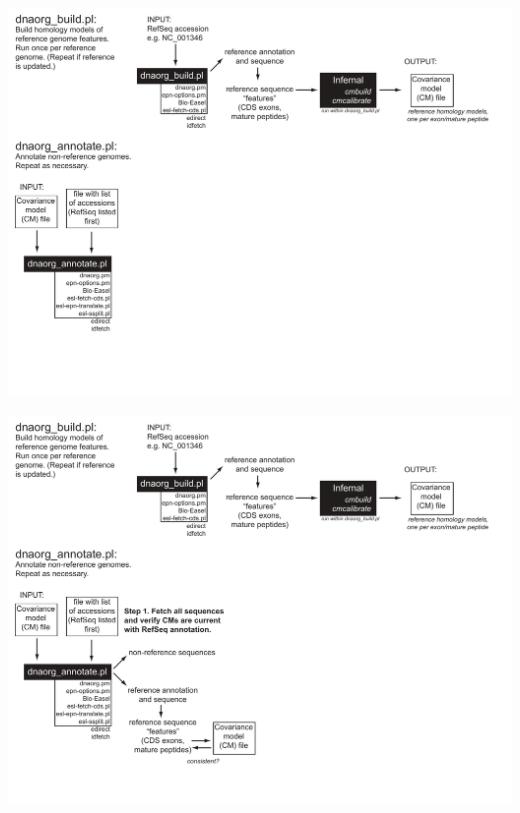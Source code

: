 \documentclass[landscape]{slides}
\begin{document}
\begin{slide}
\includegraphics[width=10in]{figs/dnaorg-scripts-annotate1}
\vfill
\end{slide}
\begin{slide}
\includegraphics[width=10in]{figs/dnaorg-scripts-annotate2}
\vfill
\end{slide}
\end{document}
